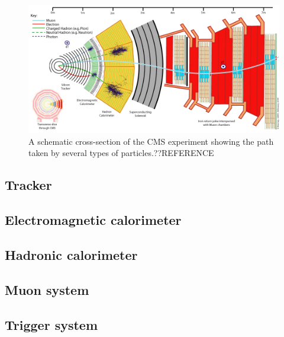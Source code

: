 \begin{figure}
  \includegraphics[width=1.2\largefigwidth]{plots/detector/CMS_Slice.png}
  \caption{A schematic cross-section of the CMS experiment showing the path taken by several types of particles.??REFERENCE}
  \label{fig:cmsschematic}
\end{figure}

\subsection{Tracker}
\label{sec:tracker}

\subsection{Electromagnetic calorimeter}
\label{sec:ECAL}

\subsection{Hadronic calorimeter}
\label{sec:HCAL}

\subsection{Muon system}


\subsection{Trigger system}
\label{sec:triggers}

